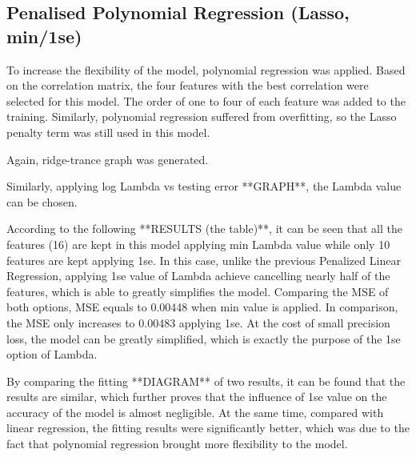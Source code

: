 \subsection{Penalised Polynomial Regression (Lasso, min/1se)} %
To increase the flexibility of the model, polynomial regression was applied. Based on the correlation matrix, the four features with the best correlation were selected for this model. The order of one to four of each feature was added to the training. Similarly, polynomial regression suffered from overfitting, so the Lasso penalty term was still used in this model.

Again, ridge-trance graph was generated.

Similarly, applying log Lambda vs testing error **GRAPH**, the Lambda value can be chosen.

According to the following **RESULTS (the table)**, it can be seen that all the features (16) are kept in this model applying min Lambda value while only 10 features are kept applying 1se. In this case, unlike the previous Penalized Linear Regression, applying 1se value of Lambda achieve cancelling nearly half of the features, which is able to greatly simplifies the model. Comparing the MSE of both options, MSE equals to 0.00448 when min value is applied. In comparison, the MSE only increases to 0.00483 applying 1se. At the cost of small precision loss, the model can be greatly simplified, which is exactly the purpose of the 1se option of Lambda.

By comparing the fitting **DIAGRAM** of two results, it can be found that the results are similar, which further proves that the influence of 1se value on the accuracy of the model is almost negligible. At the same time, compared with linear regression, the fitting results were significantly better, which was due to the fact that polynomial regression brought more flexibility to the model.



